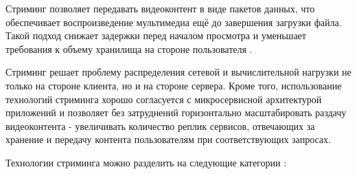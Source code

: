 	Стриминг позволяет передавать видеоконтент в виде пакетов данных, что обеспечивает воспроизведение мультимедиа ещё до завершения загрузки файла. Такой подход снижает задержки перед началом просмотра и уменьшает требования к объему хранилища на стороне пользователя \cite{apostolopoulosVideoStreaming}. 
	
	Стриминг решает проблему распределения сетевой и вычислительной нагрузки не только на стороне клиента, но и на стороне сервера. Кроме того, использование технологий стриминга хорошо согласуется с микросервисной архитектурой приложений и позволяет без затруднений горизонтально масштабировать раздачу видеоконтента - увеличивать количество реплик сервисов, отвечающих за хранение и передачу контента пользователям при соответствующих запросах. 

	Технологии стриминга можно разделить на следующие категории \cite{apostolopoulosVideoStreaming}:

